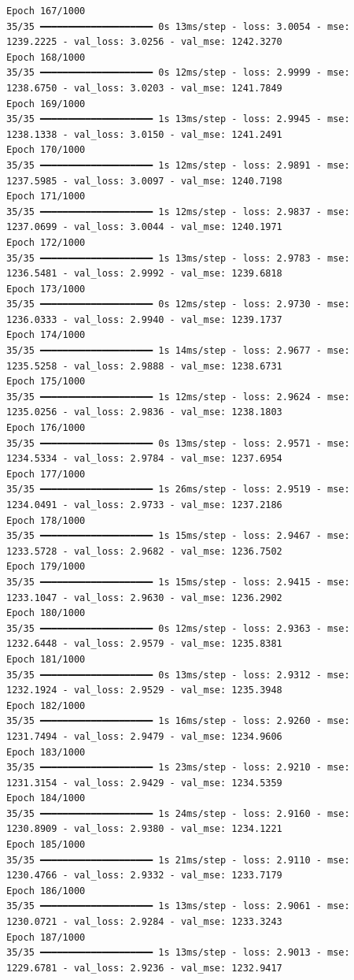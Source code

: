 \documentclass[
  letterpaper,
  DIV=11,
  numbers=noendperiod]{scrreprt}
\begin{document}
\begin{verbatim}
Epoch 167/1000
35/35 ━━━━━━━━━━━━━━━━━━━━ 0s 13ms/step - loss: 3.0054 - mse: 1239.2225 - val_loss: 3.0256 - val_mse: 1242.3270
Epoch 168/1000
35/35 ━━━━━━━━━━━━━━━━━━━━ 0s 12ms/step - loss: 2.9999 - mse: 1238.6750 - val_loss: 3.0203 - val_mse: 1241.7849
Epoch 169/1000
35/35 ━━━━━━━━━━━━━━━━━━━━ 1s 13ms/step - loss: 2.9945 - mse: 1238.1338 - val_loss: 3.0150 - val_mse: 1241.2491
Epoch 170/1000
35/35 ━━━━━━━━━━━━━━━━━━━━ 1s 12ms/step - loss: 2.9891 - mse: 1237.5985 - val_loss: 3.0097 - val_mse: 1240.7198
Epoch 171/1000
35/35 ━━━━━━━━━━━━━━━━━━━━ 1s 12ms/step - loss: 2.9837 - mse: 1237.0699 - val_loss: 3.0044 - val_mse: 1240.1971
Epoch 172/1000
35/35 ━━━━━━━━━━━━━━━━━━━━ 1s 13ms/step - loss: 2.9783 - mse: 1236.5481 - val_loss: 2.9992 - val_mse: 1239.6818
Epoch 173/1000
35/35 ━━━━━━━━━━━━━━━━━━━━ 0s 12ms/step - loss: 2.9730 - mse: 1236.0333 - val_loss: 2.9940 - val_mse: 1239.1737
Epoch 174/1000
35/35 ━━━━━━━━━━━━━━━━━━━━ 1s 14ms/step - loss: 2.9677 - mse: 1235.5258 - val_loss: 2.9888 - val_mse: 1238.6731
Epoch 175/1000
35/35 ━━━━━━━━━━━━━━━━━━━━ 1s 12ms/step - loss: 2.9624 - mse: 1235.0256 - val_loss: 2.9836 - val_mse: 1238.1803
Epoch 176/1000
35/35 ━━━━━━━━━━━━━━━━━━━━ 0s 13ms/step - loss: 2.9571 - mse: 1234.5334 - val_loss: 2.9784 - val_mse: 1237.6954
Epoch 177/1000
35/35 ━━━━━━━━━━━━━━━━━━━━ 1s 26ms/step - loss: 2.9519 - mse: 1234.0491 - val_loss: 2.9733 - val_mse: 1237.2186
Epoch 178/1000
35/35 ━━━━━━━━━━━━━━━━━━━━ 1s 15ms/step - loss: 2.9467 - mse: 1233.5728 - val_loss: 2.9682 - val_mse: 1236.7502
Epoch 179/1000
35/35 ━━━━━━━━━━━━━━━━━━━━ 1s 15ms/step - loss: 2.9415 - mse: 1233.1047 - val_loss: 2.9630 - val_mse: 1236.2902
Epoch 180/1000
35/35 ━━━━━━━━━━━━━━━━━━━━ 0s 12ms/step - loss: 2.9363 - mse: 1232.6448 - val_loss: 2.9579 - val_mse: 1235.8381
Epoch 181/1000
35/35 ━━━━━━━━━━━━━━━━━━━━ 0s 13ms/step - loss: 2.9312 - mse: 1232.1924 - val_loss: 2.9529 - val_mse: 1235.3948
Epoch 182/1000
35/35 ━━━━━━━━━━━━━━━━━━━━ 1s 16ms/step - loss: 2.9260 - mse: 1231.7494 - val_loss: 2.9479 - val_mse: 1234.9606
Epoch 183/1000
35/35 ━━━━━━━━━━━━━━━━━━━━ 1s 23ms/step - loss: 2.9210 - mse: 1231.3154 - val_loss: 2.9429 - val_mse: 1234.5359
Epoch 184/1000
35/35 ━━━━━━━━━━━━━━━━━━━━ 1s 24ms/step - loss: 2.9160 - mse: 1230.8909 - val_loss: 2.9380 - val_mse: 1234.1221
Epoch 185/1000
35/35 ━━━━━━━━━━━━━━━━━━━━ 1s 21ms/step - loss: 2.9110 - mse: 1230.4766 - val_loss: 2.9332 - val_mse: 1233.7179
Epoch 186/1000
35/35 ━━━━━━━━━━━━━━━━━━━━ 1s 13ms/step - loss: 2.9061 - mse: 1230.0721 - val_loss: 2.9284 - val_mse: 1233.3243
Epoch 187/1000
35/35 ━━━━━━━━━━━━━━━━━━━━ 1s 13ms/step - loss: 2.9013 - mse: 1229.6781 - val_loss: 2.9236 - val_mse: 1232.9417

\end{verbatim}
\end{document}
